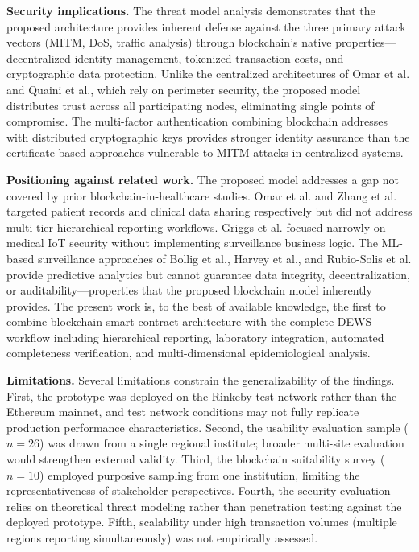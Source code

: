 \documentclass[AMA,LATO1COL]{WileyNJD-v2}
\begin{document}
\textbf{Security implications.} The threat model analysis demonstrates that the proposed architecture provides inherent defense against the three primary attack vectors (MITM, DoS, traffic analysis) through blockchain's native properties---decentralized identity management, tokenized transaction costs, and cryptographic data protection. Unlike the centralized architectures of Omar et al.\cite{omar2019privacy} and Quaini et al.,\cite{quaini2018model} which rely on perimeter security, the proposed model distributes trust across all participating nodes, eliminating single points of compromise. The multi-factor authentication combining blockchain addresses with distributed cryptographic keys provides stronger identity assurance than the certificate-based approaches vulnerable to MITM attacks in centralized systems.

\textbf{Positioning against related work.} The proposed model addresses a gap not covered by prior blockchain-in-healthcare studies. Omar et al.\cite{omar2019privacy} and Zhang et al.\cite{zhang2018fhirchain} targeted patient records and clinical data sharing respectively but did not address multi-tier hierarchical reporting workflows. Griggs et al.\cite{griggs2018healthcare} focused narrowly on medical IoT security without implementing surveillance business logic. The ML-based surveillance approaches of Bollig et al.,\cite{bollig2020machine} Harvey et al.,\cite{harvey2021predicting} and Rubio-Solis et al.\cite{rubiosolis2019zika} provide predictive analytics but cannot guarantee data integrity, decentralization, or auditability---properties that the proposed blockchain model inherently provides. The present work is, to the best of available knowledge, the first to combine blockchain smart contract architecture with the complete DEWS workflow including hierarchical reporting, laboratory integration, automated completeness verification, and multi-dimensional epidemiological analysis.

\textbf{Limitations.} Several limitations constrain the generalizability of the findings. First, the prototype was deployed on the Rinkeby test network rather than the Ethereum mainnet, and test network conditions may not fully replicate production performance characteristics. Second, the usability evaluation sample ($n=26$) was drawn from a single regional institute; broader multi-site evaluation would strengthen external validity. Third, the blockchain suitability survey ($n=10$) employed purposive sampling from one institution, limiting the representativeness of stakeholder perspectives. Fourth, the security evaluation relies on theoretical threat modeling rather than penetration testing against the deployed prototype. Fifth, scalability under high transaction volumes (multiple regions reporting simultaneously) was not empirically assessed.
\end{document}

